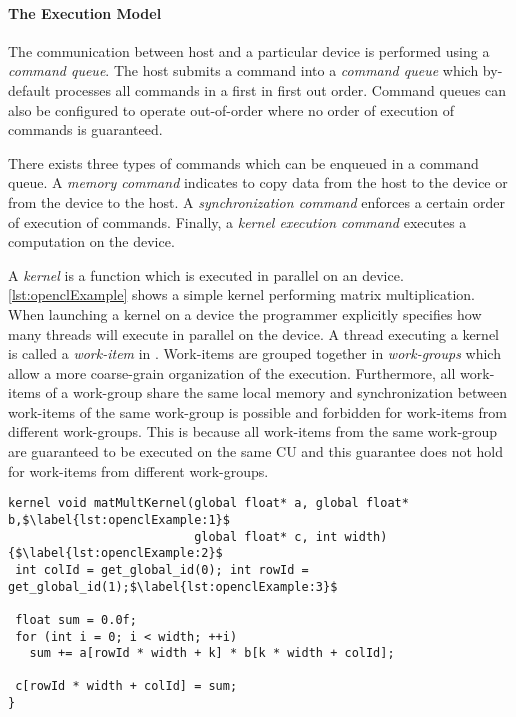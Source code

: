 \paragraph{The \OpenCL Execution Model}
The communication between host and a particular device is performed using a \emph{command queue}.
The host submits a command into a \emph{command queue} which by-default processes all commands in a first in first out order.
Command queues can also be configured to operate out-of-order where no order of execution of commands is guaranteed.

There exists three types of commands which can be enqueued in a command queue.
A \emph{memory command} indicates to copy data from the host to the device or from the device to the host.
A \emph{synchronization command} enforces a certain order of execution of commands.
Finally, a \emph{kernel execution command} executes a computation on the device.

A \emph{kernel} is a function which is executed in parallel on an \OpenCL device.
\autoref{lst:openclExample} shows a simple \OpenCL kernel performing matrix multiplication.
When launching a kernel on a device the programmer explicitly specifies how many threads will execute in parallel on the device.
A thread executing a kernel is called a \emph{work-item} in \OpenCL.
Work-items are grouped together in \emph{work-groups} which allow a more coarse-grain organization of the execution.
Furthermore, all work-items of a work-group share the same local memory and synchronization between work-items of the same work-group is possible and forbidden for work-items from different work-groups.
This is because all work-items from the same work-group are guaranteed to be executed on the same CU and this guarantee does not hold for work-items from different work-groups.

\begin{lstlisting}[float, caption={Example of an \OpenCL kernel.}, label={lst:openclExample}]
kernel void matMultKernel(global float* a, global float* b,$\label{lst:openclExample:1}$
                          global float* c, int width) {$\label{lst:openclExample:2}$
 int colId = get_global_id(0); int rowId = get_global_id(1);$\label{lst:openclExample:3}$

 float sum = 0.0f;
 for (int i = 0; i < width; ++i)
   sum += a[rowId * width + k] * b[k * width + colId];

 c[rowId * width + colId] = sum;
}
\end{lstlisting}


